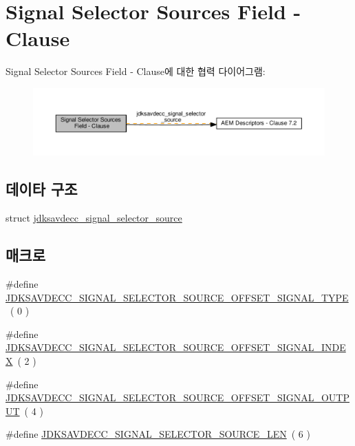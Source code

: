 \hypertarget{group__signal__selector__source}{}\section{Signal Selector Sources Field -\/ Clause}
\label{group__signal__selector__source}
Signal Selector Sources Field -\/ Clause에 대한 협력 다이어그램\+:
\nopagebreak
\begin{figure}[H]
\begin{center}
\leavevmode
\includegraphics[width=350pt]{group__signal__selector__source}
\end{center}
\end{figure}
\subsection*{데이타 구조}
\begin{DoxyCompactItemize}
\item 
struct \hyperlink{structjdksavdecc__signal__selector__source}{jdksavdecc\+\_\+signal\+\_\+selector\+\_\+source}
\end{DoxyCompactItemize}
\subsection*{매크로}
\begin{DoxyCompactItemize}
\item 
\#define \hyperlink{group__signal__selector__source_gacb47e5f1b011080094ecdc78a339d3f1}{J\+D\+K\+S\+A\+V\+D\+E\+C\+C\+\_\+\+S\+I\+G\+N\+A\+L\+\_\+\+S\+E\+L\+E\+C\+T\+O\+R\+\_\+\+S\+O\+U\+R\+C\+E\+\_\+\+O\+F\+F\+S\+E\+T\+\_\+\+S\+I\+G\+N\+A\+L\+\_\+\+T\+Y\+PE}~( 0 )
\item 
\#define \hyperlink{group__signal__selector__source_ga2dd62e81f0012c868107cca8915374a9}{J\+D\+K\+S\+A\+V\+D\+E\+C\+C\+\_\+\+S\+I\+G\+N\+A\+L\+\_\+\+S\+E\+L\+E\+C\+T\+O\+R\+\_\+\+S\+O\+U\+R\+C\+E\+\_\+\+O\+F\+F\+S\+E\+T\+\_\+\+S\+I\+G\+N\+A\+L\+\_\+\+I\+N\+D\+EX}~( 2 )
\item 
\#define \hyperlink{group__signal__selector__source_ga35f444b99953c92b23461cc845cd2e21}{J\+D\+K\+S\+A\+V\+D\+E\+C\+C\+\_\+\+S\+I\+G\+N\+A\+L\+\_\+\+S\+E\+L\+E\+C\+T\+O\+R\+\_\+\+S\+O\+U\+R\+C\+E\+\_\+\+O\+F\+F\+S\+E\+T\+\_\+\+S\+I\+G\+N\+A\+L\+\_\+\+O\+U\+T\+P\+UT}~( 4 )
\item 
\#define \hyperlink{group__signal__selector__source_ga70171d7a5ae8bc4f88d72d79f74d4c75}{J\+D\+K\+S\+A\+V\+D\+E\+C\+C\+\_\+\+S\+I\+G\+N\+A\+L\+\_\+\+S\+E\+L\+E\+C\+T\+O\+R\+\_\+\+S\+O\+U\+R\+C\+E\+\_\+\+L\+EN}~( 6 )
\end{DoxyCompactItemize}
